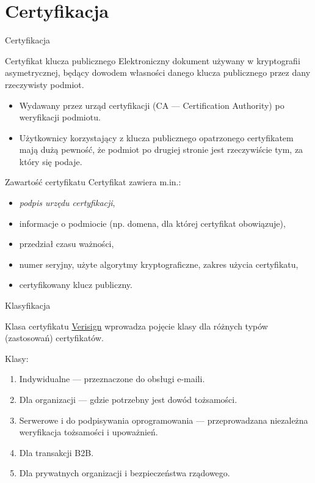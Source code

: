 \section{Certyfikacja}

\begin{frame}{Certyfikacja}
	\begin{alertblock}{Certyfikat klucza publicznego}
		Elektroniczny dokument używany w kryptografii asymetrycznej, będący dowodem własności danego klucza publicznego przez dany rzeczywisty podmiot.
	\end{alertblock}
	\begin{itemize}
		\item Wydawany przez urząd certyfikacji (CA — Certification Authority) po weryfikacji podmiotu.
		\item Użytkownicy korzystający z klucza publicznego opatrzonego certyfikatem mają dużą pewność, że podmiot po drugiej stronie jest rzeczywiście tym, za który się podaje.
	\end{itemize}
\end{frame}

\begin{frame}{Zawartość certyfikatu}
	Certyfikat zawiera m.in.:
	\begin{itemize}
		\item \emph{podpis urzędu certyfikacji},
		\item informacje o podmiocie (np. domena, dla której certyfikat obowiązuje),
		\item przedział czasu ważności,
		\item numer seryjny, użyte algorytmy kryptograficzne, zakres użycia certyfikatu,
		\item certyfikowany klucz publiczny.
	\end{itemize}
\end{frame}

\begin{frame}{Klasyfikacja}
	\begin{alertblock}{Klasa certyfikatu}
		\href{http://www.verisigninc.com/}{Verisign} wprowadza pojęcie klasy dla różnych typów (zastosowań) certyfikatów.
	\end{alertblock}
	Klasy:
	\begin{enumerate}
		\item Indywidualne --- przeznaczone do obsługi e-maili.
		\item Dla organizacji --- gdzie potrzebny jest dowód tożsamości.
		\item Serwerowe i do podpisywania oprogramowania --- przeprowadzana niezależna weryfikacja tożsamości i upoważnień.
		\item Dla transakcji B2B.
		\item Dla prywatnych organizacji i bezpieczeństwa rządowego.
	\end{enumerate}
\end{frame}